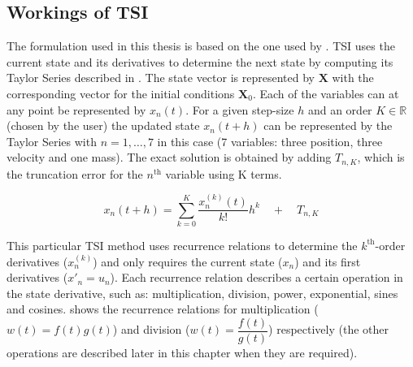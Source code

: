 \subsection{Workings of \ac{TSI}}
\label{subsec:workTsi}
The formulation used in this thesis is based on the one used by \cite{scott2008high}. \ac{TSI} uses the current state and its derivatives to determine the next state by computing its Taylor Series described in . The state vector is represented by $\mathbf{X}$ with the corresponding vector for the initial conditions $\mathbf{X}_{0}$. Each of the variables can at any point be represented by $x_{n}\left(t\right)$. For a given step-size $h$ and an order $K \in \mathbb{R}$ (chosen by the user) the updated state $x_{n}\left(t+h\right)$ can be represented by the Taylor Series with $n=1,\dots,7$ in this case (7 variables: three position, three velocity and one mass). The exact solution is obtained by adding $T_{n,K}$, which is the truncation error for the $n^{\text{th}}$ variable using K terms. 






\begin{equation} \label{eq:general_taylor}
x_{n}\left(t+h\right)=\displaystyle\sum_{k=0}^{K}\dfrac{x_{n}^{\left(k\right)}\left(t\right)}{k!}h^{k} \quad + \quad	T_{n,K}
\end{equation}

\noindent
This particular \ac{TSI} method uses recurrence relations to determine the $k^{\text{th}}$-order derivatives ($x^{\left(k\right)}_{n}$) and only requires the current state ($x_{n}$) and its first derivatives ($x'_{n} = u_{n}$). Each recurrence relation describes a certain operation in the state derivative, such as: multiplication, division, power, exponential, sines and cosines.  shows the recurrence relations for multiplication ($w\left(t\right)=f\left(t\right)g\left(t\right)$) and division ($w\left(t\right)=\dfrac{f\left(t\right)}{g\left(t\right)}$) respectively (the other operations are described later in this chapter when they are required).

